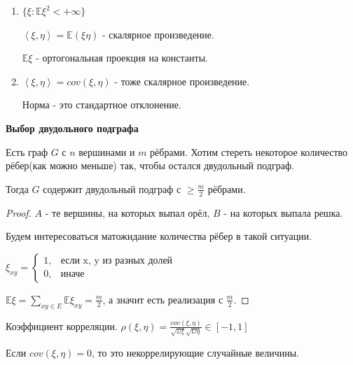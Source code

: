 \begin{remark}
    \begin{enumerate}
        \item {
            $\{ \xi : \mathbb{E} \xi^2 < +\infty \}$

            $\left <\xi, \eta \right > = \mathbb{E} (\xi \eta)$ - скалярное произведение.

            $\mathbb{E} \xi$ - ортогональная проекция на константы.
        }
        \item {
            $\left < \xi, \eta \right > = cov (\xi, \eta)$ - тоже скалярное произведение.

            Норма - это стандартное отклонение.
        }
    \end{enumerate}
\end{remark}

\begin{theorem}
    \textbf{Выбор двудольного подграфа}

    Есть граф $G$ с $n$ вершинами и $m$ рёбрами. Хотим стереть некоторое количество рёбер(как можно меньше) так, чтобы
    остался двудольный подграф.

    Тогда $G$ содержит двудольный подграф с $\geqslant \frac{m}{2}$ рёбрами.
\end{theorem}

\begin{proof}
    $A$ - те вершины, на которых выпал орёл, $B$ - на которых выпала решка.

    Будем интересоваться матожидание количества рёбер в такой ситуации.

    $
    \xi_{xy} = 
    \begin{cases}
        1, & \text{если x, y из разных долей} \\
        0, & \text{иначе}
    \end{cases}
    $

    $\mathbb{E} \xi = \sum_{xy \in E} \mathbb{E} \xi_{xy} = \frac{m}{2}$, а значит есть реализация с $\frac{m}{2}$.
\end{proof}

\begin{definition}
    Коэффициент корреляции. $\rho (\xi, \eta) = \frac{cov (\xi, \eta)}{\sqrt{\mathbb{D} \xi} \sqrt{\mathbb{D} \eta}} \in [-1, 1]$ 
\end{definition}

\begin{definition}
    Если $cov (\xi, \eta) = 0$, то это некоррелирующие случайные величины.
\end{definition}

